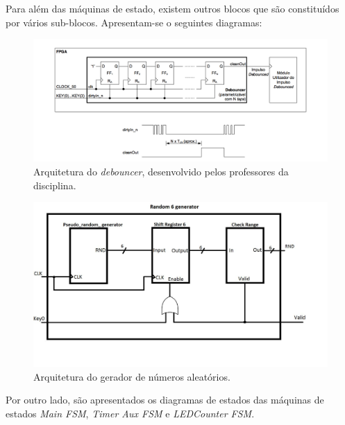 \documentclass[a4paper,11pt,onecolumn]{report}
\begin{document}
\pagebreak

Para além das máquinas de estado, existem outros blocos que são constituídos por vários sub-blocos. Apresentam-se o seguintes diagramas:

\begin{figure}[h]
\centerline{\includegraphics[scale=0.3]{Images/debouncerBlock}}
\caption{Arquitetura do \textit{debouncer}, desenvolvido pelos professores da disciplina.}
\label{figdebounce}
\end{figure}

\begin{figure}[h]
\centerline{\includegraphics[scale=0.3]{Images/RandomGenerator}}
\caption{Arquitetura do gerador de números aleatórios.}
\label{figrndgenerator}
\end{figure}

\pagebreak

Por outro lado, são apresentados os diagramas de estados das máquinas de estados \textit{Main FSM}, \textit{Timer Aux FSM} e \textit{LEDCounter FSM}.
\end{document}
